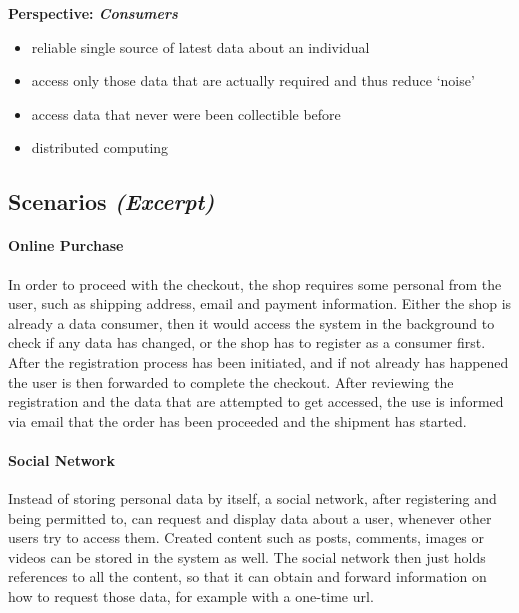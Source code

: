 \documentclass[12pt,english,a4paper,titlepage,cleardoublepage=empty,dottedtoc]{report}
\providecommand{\tightlist}{%
  \setlength{\itemsep}{0pt}\setlength{\parskip}{0pt}}
\begin{document}
\textbf{Perspective: \emph{Consumers}}

\begin{itemize}
\tightlist
\item
  reliable single source of latest data about an individual
\item
  access only those data that are actually required and thus reduce
  `noise'
\item
  access data that never were been collectible before
\item
  distributed computing
\end{itemize}

\subsection*{\texorpdfstring{Scenarios
\emph{(Excerpt)}}{Scenarios (Excerpt)}}\label{scenarios-excerpt}

\paragraph{Online Purchase}\label{online-purchase}

In order to proceed with the checkout, the shop requires some personal
from the user, such as shipping address, email and payment information.
Either the shop is already a data consumer, then it would access the
system in the background to check if any data has changed, or the shop
has to register as a consumer first. After the registration process has
been initiated, and if not already has happened the user is then
forwarded to complete the checkout. After reviewing the registration and
the data that are attempted to get accessed, the use is informed via
email that the order has been proceeded and the shipment has started.

\paragraph{Social Network}\label{social-network}

Instead of storing personal data by itself, a social network, after
registering and being permitted to, can request and display data about a
user, whenever other users try to access them. Created content such as
posts, comments, images or videos can be stored in the system as well.
The social network then just holds references to all the content, so
that it can obtain and forward information on how to request those data,
for example with a one-time url.
\end{document}
